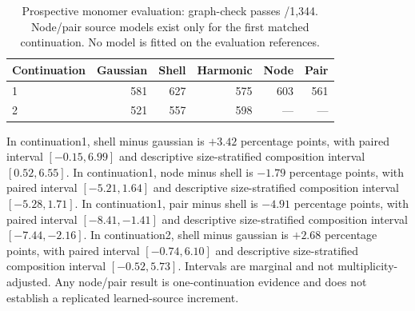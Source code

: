 \begin{table}[t]
\centering
\caption{Prospective monomer evaluation: graph-check passes /1,344. Node/pair source models exist only for the first matched continuation. No model is fitted on the evaluation references.}
\begin{tabular}{lrrrrr}
\toprule
Continuation & Gaussian & Shell & Harmonic & Node & Pair\\
\midrule
1 & 581 & 627 & 575 & 603 & 561\\
2 & 521 & 557 & 598 & --- & ---\\
\bottomrule
\end{tabular}
\label{tab:monomer}
\end{table}
In continuation1, shell minus gaussian is $+3.42$ percentage points, with paired interval $[-0.15,6.99]$ and descriptive size-stratified composition interval $[0.52,6.55]$.
In continuation1, node minus shell is $-1.79$ percentage points, with paired interval $[-5.21,1.64]$ and descriptive size-stratified composition interval $[-5.28,1.71]$.
In continuation1, pair minus shell is $-4.91$ percentage points, with paired interval $[-8.41,-1.41]$ and descriptive size-stratified composition interval $[-7.44,-2.16]$.
In continuation2, shell minus gaussian is $+2.68$ percentage points, with paired interval $[-0.74,6.10]$ and descriptive size-stratified composition interval $[-0.52,5.73]$.
Intervals are marginal and not multiplicity-adjusted. Any node/pair result is one-continuation evidence and does not establish a replicated learned-source increment.
